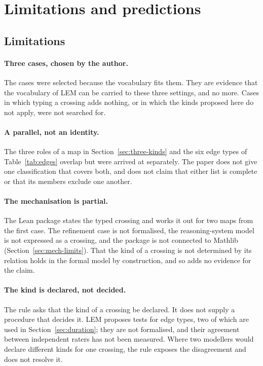 \section{Limitations and predictions}
\label{sec:limits}

\subsection{Limitations}

\paragraph{Three cases, chosen by the author.} The cases were selected because the
vocabulary fits them. They are evidence that the vocabulary of LEM can be carried to
these three settings, and no more. Cases in which typing a crossing adds nothing, or in
which the kinds proposed here do not apply, were not searched for.

\paragraph{A parallel, not an identity.} The three roles of a map in
Section~\ref{sec:three-kinds} and the six edge types of Table~\ref{tab:edges} overlap but
were arrived at separately. The paper does not give one classification that covers both,
and does not claim that either list is complete or that its members exclude one
another.

\paragraph{The mechanisation is partial.} The Lean package states the typed crossing
and works it out for two maps from the first case. The refinement case is not
formalised, the reasoning-system model is not expressed as a crossing, and the package
is not connected to Mathlib (Section~\ref{sec:mech-limits}). That the kind of a
crossing is not determined by its relation holds in the formal model by construction,
and so adds no evidence for the claim.

\paragraph{The kind is declared, not decided.} The rule asks that the kind of a crossing
be declared. It does not supply a procedure that decides it. LEM proposes tests for edge
types, two of which are used in Section~\ref{sec:duration}; they are not formalised, and
their agreement between independent raters has not been measured. Where two modellers
would declare different kinds for one crossing, the rule exposes the disagreement and
does not resolve it.

